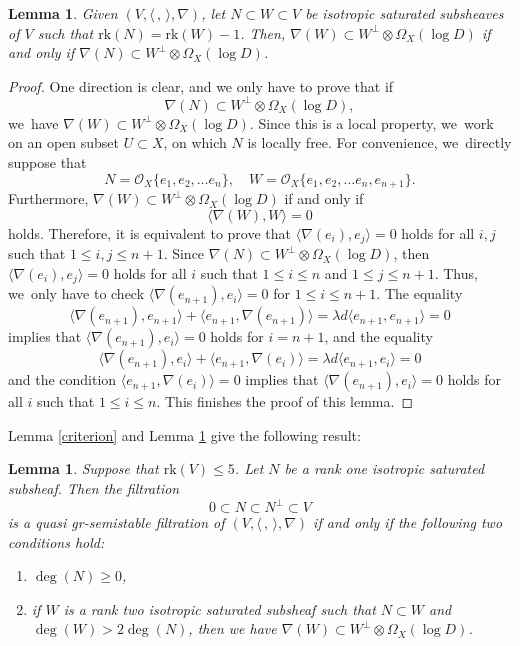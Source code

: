 \documentclass[11pt]{article}
\numberwithin{equation}{section}
\newcommand{\grsemistable}{gr\nobreakdash-semi\-stable\xspace}
\newcommand{\rk}{\mathrm{rk}}
\theoremstyle{plain}
\newtheorem{lem}[thm]{Lemma}
\theoremstyle{definition}
\begin{document}
\begin{lem}\label{cork1}
Given $(V,\langle \,, \, \rangle,\nabla)$, let $N \subset W \subset V$ be isotropic saturated subsheaves of $V$ such that $\rk(N)=\rk(W)-1$. Then, $\nabla(W)\subset W^\perp\otimes \Omega_X(\log D)$ if and only if $\nabla(N)\subset W^\perp\otimes \Omega_X(\log D)$.
\end{lem}
\begin{proof}
One direction is clear, and we only have to prove that if
\[
\nabla(N)\subset W^\perp\otimes \Omega_X(\log D),
\]
we~have $\nabla(W)\subset W^\perp\otimes \Omega_X(\log D)$. Since this is a local property, we~work on an open subset $U \subset X$, on which $N$ is locally free. For convenience, we~directly suppose that
\[
N=\mathcal{O}_X\{e_1, e_2,\dots e_n\},\quad W=\mathcal{O}_X\{e_1, e_2,\dots e_n, e_{n+1}\}.
\]
Furthermore, $\nabla(W)\subset W^\perp\otimes \Omega_X(\log D)$ if and only if
\[
\langle \nabla(W),W \rangle=0
\]
holds. Therefore, it is equivalent to prove that $\langle \nabla(e_i), e_j \rangle=0$ holds for all $i,j$ such that $1\leq i,j\leq n+1$. Since $\nabla(N)\subset W^\perp\otimes \Omega_X(\log D)$, then $\langle \nabla(e_i), e_j \rangle=0$ holds for all $i$ such that $1\leq i\leq n$ and $1\leq j\leq n+1$. Thus, we~only have to check $\langle \nabla(e_{n+1}), e_i \rangle=0$ for $1\leq i\leq n+1$. The equality
\[
\langle \nabla(e_{n+1}), e_{n+1} \rangle+\langle e_{n+1}, \nabla(e_{n+1}) \rangle=\lambda d\langle e_{n+1},e_{n+1} \rangle=0
\]
implies that $\langle \nabla(e_{n+1}), e_i \rangle=0$ holds for $i= n+1$, and the equality
\[
\langle \nabla(e_{n+1}), e_i \rangle+\langle e_{n+1}, \nabla(e_i) \rangle=\lambda d\langle e_{n+1},e_i \rangle=0
\]
and the condition $\langle e_{n+1}, \nabla(e_i) \rangle=0$ implies that $\langle \nabla(e_{n+1}), e_i \rangle=0$ holds for all $i$ such that $1\leq i\leq n$. This finishes the proof of this lemma.
\end{proof}

Lemma \ref{criterion} and Lemma \ref{cork1} give the following result:
\begin{lem}\label{criterionrk5}
Suppose that $\rk(V) \leq 5$. Let $N$ be a rank one isotropic saturated subsheaf. Then the filtration
\[
0\subset N\subset N^\perp\subset V
\]
is a quasi \grsemistable filtration of $(V, \langle \,, \, \rangle, \nabla)$ if and only if the following two conditions hold:
\begin{enumerate}
\item $\deg(N)\geq 0$,

\item if $W$ is a rank two isotropic saturated subsheaf such that $N \subset W$ and $\deg(W)>2\deg(N)$, then we have $\nabla(W)\subset W^\perp\otimes \Omega_X(\log D)$.
\end{enumerate}
\end{lem}
\end{document}
